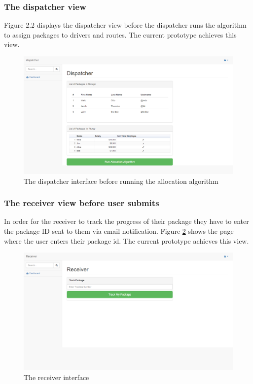 \documentclass[paper=a4, fontsize=11pt]{scrartcl} %
\numberwithin{equation}{section} %
\numberwithin{figure}{section} %
\numberwithin{table}{section} %
\begin{document}
\subsubsection{The dispatcher view}
Figure 2.2 displays the dispatcher view before the dispatcher runs the algorithm to assign packages to drivers and routes. The current prototype achieves this view.
\begin{figure}[hbt!]
\centering
\includegraphics[width=5in]{screenshots/dispatcher.png}
\caption{The dispatcher interface before running the allocation algorithm}
\label{DispatcherBefore}
\end{figure}

\subsubsection{The receiver view before user submits}
In order for the receiver to track the progress of their package they have to enter the package ID sent to them via email notification. Figure \ref{ReceiverBefore} shows the page where the user enters their package id. The current prototype achieves this view.
\begin{figure}[hbt!]
\centering
\includegraphics[width=5in]{screenshots/receiver.png}
\caption{The receiver interface}
\label{ReceiverBefore}
\end{figure}
\end{document}
